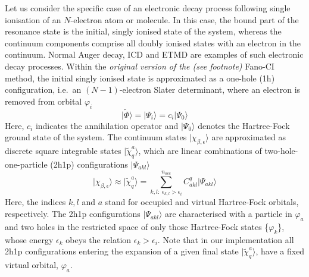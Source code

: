 \documentclass[a4paper, 10 pt]{report}
\newcommand{\ket}[1]{\ensuremath{| #1 \rangle}}
\begin{document}
Let us consider the specific case of an electronic decay process following 
single ionisation of an $N$-electron atom or molecule. In this case, the bound 
part of the resonance state is the initial, singly ionised state of the system, 
whereas the continuum components comprise all doubly ionised states with an 
electron in the continuum. Normal Auger decay, ICD and ETMD are examples of such 
electronic decay processes. Within the \textit{original version of the (see footnote)} Fano-CI method, the initial singly 
ionised state is approximated as a one-hole (1h) configuration, i.e.~an $(N-1)
$-electron Slater determinant, where an electron is removed from orbital $
\varphi_{i}$
%
\begin{equation}
\ket{\tilde{\Phi}} = \ket{\Psi_{i}} = c_{i} \ket{\Psi_{0}}
\end{equation}
%
Here, $c_{i}$ indicates the annihilation operator and \ket{\Psi_{0}} denotes 
the Hartree-Fock ground state of the system. The continuum states 
\ket{\chi_{\beta, \epsilon}} are approximated as discrete square integrable 
states \ket{\tilde{\chi}_{q}^{a}}, which are linear combinations of 
two-hole-one-particle (2h1p) configurations \ket{\Psi_{akl}}
%
\begin{equation}\label{eq:2h1p_ci_state}
\ket{\chi_{\beta, \epsilon}} \approx \ket{\tilde{\chi}_q^{a}} = \sum_{k, l :\; \epsilon_{k,l} > \epsilon_{i}}^{n_{occ}}C_{akl}^{q} \ket{\Psi_{akl}}
\end{equation}
%
Here, the indices $k, l$ and $a$ stand for occupied and virtual Hartree-Fock 
orbitals, respectively. The 2h1p configurations \ket{\Psi_{akl}} are 
characterised with a particle in $\varphi_{a}$ and two holes in the restricted 
space of only those Hartree-Fock states \{$\varphi_{k}$\}, whose energy $
\epsilon_{k}$ obeys the relation $\epsilon_{k} > \epsilon_{i}$. Note that in 
our implementation all 2h1p configurations entering the expansion of a given 
final state \ket{\tilde{\chi}_{q}^{a}}, have a fixed virtual orbital, 
$\varphi_{a}$.
\end{document}
